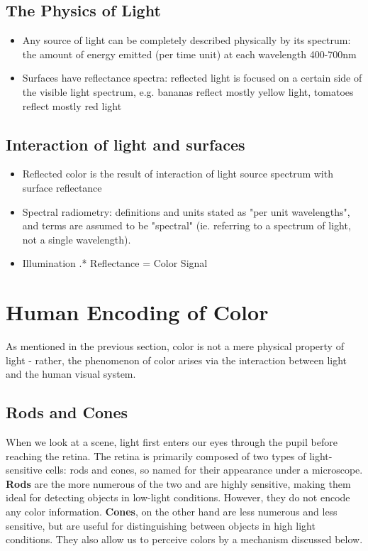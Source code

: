 \documentclass{article}
\begin{document}
\subsection{The Physics of Light}
\begin{itemize}
	\item Any source of light can be completely described physically by its spectrum: the amount of energy emitted (per time unit) at each wavelength 400-700nm
    \item Surfaces have reflectance spectra: reflected light is focused on a certain side of the visible light spectrum, e.g. bananas reflect mostly yellow light, tomatoes reflect mostly red light
\end{itemize}

\subsection{Interaction of light and surfaces}
\begin{itemize}
	\item Reflected color is the result of interaction of light source spectrum with surface reflectance
    \item Spectral radiometry: definitions and units stated as "per unit wavelengths", and terms are assumed to be "spectral" (ie. referring to a spectrum of light, not a single wavelength).
    \item Illumination .* Reflectance = Color Signal
    ~\cite{wandell1995foundations}
\end{itemize}


\section{Human Encoding of Color}
As mentioned in the previous section, color is not a mere physical property of light - rather, the phenomenon of color arises via the interaction between light and the human visual system. 
\subsection{Rods and Cones}
When we look at a scene, light first enters our eyes through the pupil before reaching the retina. The retina is primarily composed of two types of light-sensitive cells: rods and cones, so named for their appearance under a microscope. \textbf{Rods} are the more numerous of the two and are highly sensitive, making them ideal for detecting objects in low-light conditions. However, they do not encode any color information. \textbf{Cones}, on the other hand are less numerous and less sensitive, but are useful for distinguishing between objects in high light conditions. They also allow us to perceive colors by a mechanism discussed below.
\end{document}
